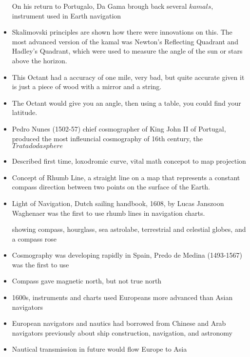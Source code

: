 \documentclass{article}
\begin{document}
\begin{itemize}
    On his return to Portugalo, Da Gama brough back several $kamals$, instrument
    used in Earth navigation
  \item Skalimovski principles are shown how there were innovations on this.
    The most advanced version of the kamal was Newton's Reflecting Quadrant and
    Hadley's Quadrant, which were used to measure the angle of the sun or stars above the horizon.
  \item This Octant had a accuracy of one mile, very bad, but quite accurate
    given it is just a piece of wood with a mirror and a string.
  \item The Octant would give you an angle, then using a table, you could
    find your latitude.
  \item Pedro Nunes (1502-57) chief cosmographer of King John II of Portugal,
    produced the most infleuncial cosmography of 16th century, the $Tratado da sphere$
  \item Described first time, loxodromic curve, vital math concepot to map projection
  \item Concept of Rhumb Line, a straight line on a map that represents a constant compass direction
    between two points on the surface of the Earth.
  \item Light of Navigation, Dutch sailing handbook, 1608, by Lucas Janszoon Waghenaer
    was the first to use rhumb lines in navigation charts.

    showing compass, hourglass, sea astrolabe, terrestrial and celestial globes, and a compass rose
  \item Cosmography was developing rapidly in Spain,
    Predo de Medina (1493-1567) was the first to use
  \item Compass gave magnetic north, but not true north
  \item 1600s, instruments and charts used Europeans more advanced than Asian navigators
  \item European navigators and nautics had borrowed from Chinese and Arab navigators previously
    about ship construction, navigation, and astronomy
  \item Nautical transmission in future would flow Europe to Asia
\end{itemize}

\newpage
\end{document}
